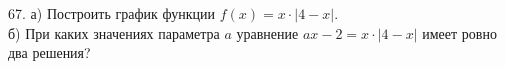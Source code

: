 67. а) Построить график функции $f(x)=x\cdot|4-x|.$\\
б) При каких значениях параметра $a$ уравнение $ax-2=x\cdot|4-x|$ имеет ровно два решения?\\
